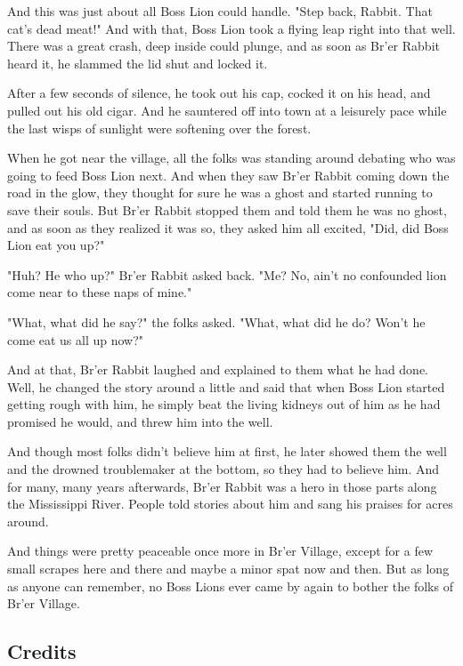 And this was just about all Boss Lion could handle. "Step back, Rabbit. That cat's dead meat!" And with that, Boss Lion took a flying leap right into that well. There was a great crash, deep inside could plunge, and as soon as Br'er Rabbit heard it, he slammed the lid shut and locked it.

After a few seconds of silence, he took out his cap, cocked it on his head, and pulled out his old cigar. And he sauntered off into town at a leisurely pace while the last wisps of sunlight were softening over the forest.

When he got near the village, all the folks was standing around debating who was going to feed Boss Lion next. And when they saw Br'er Rabbit coming down the road in the glow, they thought for sure he was a ghost and started running to save their souls. But Br'er Rabbit stopped them and told them he was no ghost, and as soon as they realized it was so, they asked him all excited, "Did, did Boss Lion eat you up?"

"Huh? He who up?" Br'er Rabbit asked back. "Me? No, ain't no confounded lion come near to these naps of mine."

"What, what did he say?" the folks asked. "What, what did he do? Won't he come eat us all up now?"

And at that, Br'er Rabbit laughed and explained to them what he had done. Well, he changed the story around a little and said that when Boss Lion started getting rough with him, he simply beat the living kidneys out of him as he had promised he would, and threw him into the well.

And though most folks didn't believe him at first, he later showed them the well and the drowned troublemaker at the bottom, so they had to believe him. And for many, many years afterwards, Br'er Rabbit was a hero in those parts along the Mississippi River. People told stories about him and sang his praises for acres around.

And things were pretty peaceable once more in Br'er Village, except for a few small scrapes here and there and maybe a minor spat now and then. But as long as anyone can remember, no Boss Lions ever came by again to bother the folks of Br'er Village.

\subsection{Credits}
